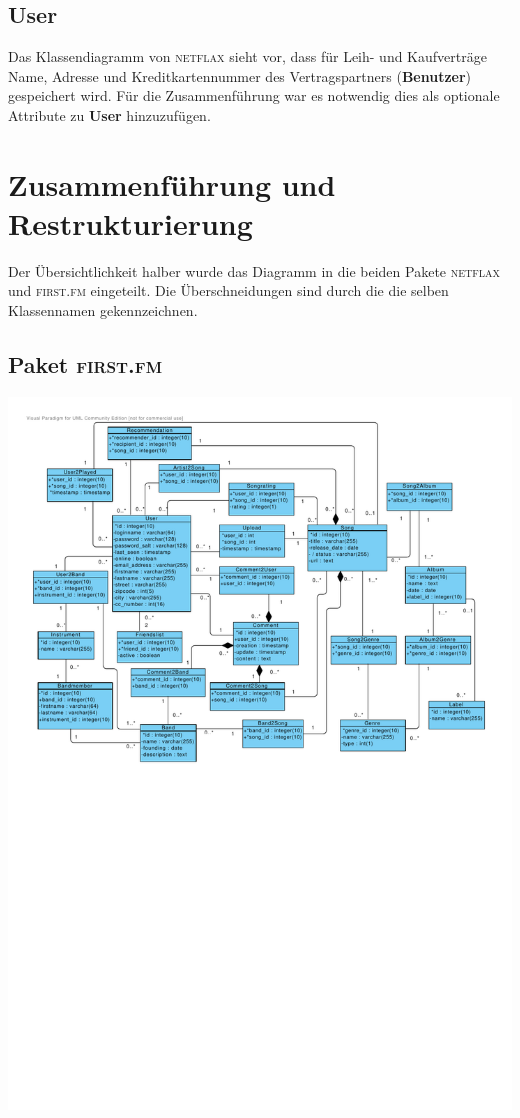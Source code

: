 \documentclass[11pt,a4paper,DIV=9]{scrartcl}
\begin{document}
  \subsection{User}
    Das Klassendiagramm von \textsc{netflax} sieht vor, dass für Leih- und Kaufverträge Name, Adresse und Kreditkartennummer des Vertragspartners (\textbf{Benutzer}) gespeichert wird. Für die Zusammenführung war es notwendig dies als optionale Attribute zu \textbf{User} hinzuzufügen.



\section{Zusammenführung und Restrukturierung}
  Der Übersichtlichkeit halber wurde das Diagramm in die beiden Pakete \textsc{netflax} und \textsc{first.fm} eingeteilt. Die Überschneidungen sind durch die die selben Klassennamen gekennzeichnen.

  \subsection{Paket \textsc{first.fm}}
    \includegraphics[angle=90,trim=1cm 0cm 1.1cm 1cm, clip=true, scale=0.99]{Diagramme/Paket_FirstFm}
\end{document}
